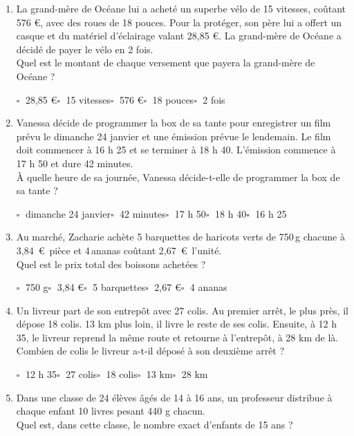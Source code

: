 \documentclass[10pt,a4paper]{article}
\begin{document}
\begin{enumerate}[itemsep=2em]
    	$\square\;$ 1,40 €\qquad $\square\;$ 45 ans\qquad $\square\;$ 45 min\qquad $\square\;$ 7 h 45\qquad $\square\;$ 4 fois\qquad 
	\item La grand-mère de Océane lui a acheté un superbe vélo de 15 vitesses, coûtant 576 €, avec des roues de 18 pouces. Pour la protéger, son père lui a offert un casque et du matériel d'éclairage valant 28,85 €. La grand-mère de Océane a décidé de payer le vélo en 2 fois.\\Quel est le montant de chaque versement que payera la grand-mère de Océane ? 
    
    	$\square\;$ 28,85 €\qquad $\square\;$ 15 vitesses\qquad $\square\;$ 576 €\qquad $\square\;$ 18 pouces\qquad $\square\;$ 2 fois\qquad 
	\item Vanessa décide de programmer la box de sa tante pour enregistrer un film prévu le dimanche 24 janvier et une émission prévue le lendemain. Le film doit commencer à 16 h 25 et se terminer à 18 h 40. L'émission commence à 17 h 50 et dure 42 minutes.\\À quelle heure de sa journée, Vanessa décide-t-elle de programmer la box de sa tante ? 
    
    	$\square\;$ dimanche 24 janvier\qquad $\square\;$ 42 minutes\qquad $\square\;$ 17 h 50\qquad $\square\;$ 18 h 40\qquad $\square\;$ 16 h 25\qquad 
	\item Au marché, Zacharie achète 5 barquettes de haricots verts de 750\,g chacune à 3,84\, €~pièce  et 4\,ananas coûtant 2,67\, €~l'unité.\\Quel est le prix total des boissons achetées ? 
    
    	$\square\;$ 750 g\qquad $\square\;$ 3,84 €\qquad $\square\;$ 5 barquettes\qquad $\square\;$ 2,67 €\qquad $\square\;$ 4 ananas\qquad 
	\item Un livreur part de son entrepôt avec 27 colis. Au premier arrêt, le plus près, il dépose 18 colis. 13 km plus loin, il livre le reste de ses colis. Ensuite, à 12 h 35, le livreur reprend la même route et retourne à l'entrepôt, à 28 km de là.\\Combien de colis le livreur a-t-il déposé à son deuxième arrêt ? 
    
    	$\square\;$ 12 h 35\qquad $\square\;$ 27 colis\qquad $\square\;$ 18 colis\qquad $\square\;$ 13 km\qquad $\square\;$ 28 km\qquad 
	\item Dans une classe de 24 élèves âgés de 14  à 16  ans, un professeur distribue à chaque enfant 10 livres pesant 440 g chacun.\\Quel est, dans cette classe, le nombre exact d'enfants de 15 ans ? 
    

\end{enumerate}
\end{document}
